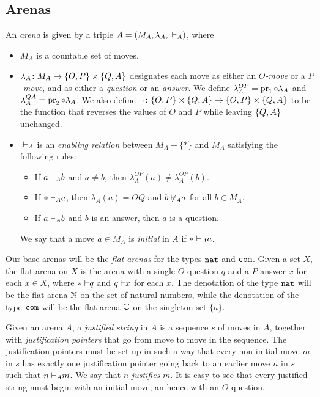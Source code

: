 \documentclass[sigplan,9pt,review]{acmart}\settopmatter{printfolios=true,printccs=false,printacmref=false}
\begin{document}
\subsection{Arenas}

An \emph{arena} is given by a triple $A=(M_A,\lambda_A,{\;\vdash}_A)$, where
\begin{itemize}
  \item $M_A$ is a countable set of moves,
  \item $\lambda_A\colon M_A\to\{O,P\}\times\{Q,A\}$ designates each move as either an \emph{$O$-move} or a \emph{$P$-move}, and as either a \emph{question} or an \emph{answer}.  
    We define $\lambda_A^{OP}=\operatorname{pr}_1\circ\lambda_A$ and $\lambda_A^{QA}=\operatorname{pr}_2\circ\lambda_A$.  
    We also define $\neg\colon\{O,P\}\times\{Q,A\}\to\{O,P\}\times\{Q,A\}$ to be the function that reverses the values of $O$ and $P$ while leaving $\{Q,A\}$ unchanged.
  \item ${\;\vdash}_A$ is an \emph{enabling relation} between $M_A+\{*\}$ and $M_A$ satisfying the following rules:
    \begin{itemize}
      \item If $a{\;\vdash}_A b$ and $a\ne b$, then $\lambda_A^{OP}(a)\neq\lambda_A^{OP}(b)$.  
      \item If $*{\;\vdash}_A a$, then $\lambda_A(a)=OQ$ and $b{\;\not\vdash}_A a$ for all $b\in M_A$.
      \item If $a{\;\vdash}_A b$ and $b$ is an answer, then $a$ is a question.
    \end{itemize}
    We say that a move $a\in M_A$ is \emph{initial} in $A$ if $*{\;\vdash}_A a$.
\end{itemize}

Our base arenas will be the \emph{flat arenas} for the types ${\mathtt{nat}}$ and ${\mathtt{com}}$.  
Given a set $X$, the flat arena on $X$ is the arena with a single $O$-question $q$ and a $P$-answer $x$ for each $x\in X$, where $*{\;\vdash} q$ and $q{\;\vdash} x$ for each $x$.  
The denotation of the type ${\mathtt{nat}}$ will be the flat arena $\mathbb{N}$ on the set of natural numbers, while the denotation of the type ${\mathtt{com}}$ will be the flat arena $\mathbb{C}$ on the singleton set $\{a\}$.

Given an arena $A$, a \emph{justified string} in $A$ is a sequence $s$ of moves in $A$, together with \emph{justification pointers} that go from move to move in the sequence.  
The justification pointers must be set up in such a way that every non-initial move $m$ in $s$ has exactly one justification pointer going back to an earlier move $n$ in $s$ such that $n{\;\vdash}_A m$.  
We say that $n$ \emph{justifies} $m$.  
It is easy to see that every justified string must begin with an initial move, an hence with an $O$-question.  
\end{document}
